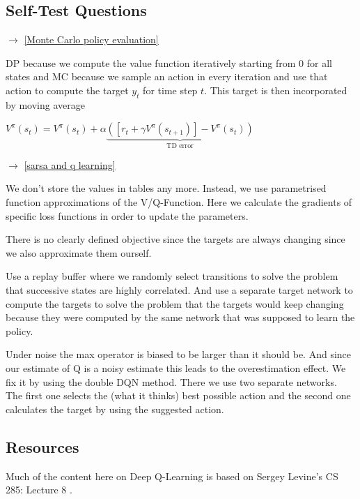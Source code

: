 \subsection{Self-Test Questions}
 \begin{enumerate}
     
 $\rightarrow$ \ref{Monte Carlo policy evaluation}

\newline DP because we compute the value function iteratively starting 
from 0 for all states and MC because we sample an action in every iteration and use 
that action to compute the target $y_t$ for time step $t$. This target is then 
incorporated by moving average 

$V^{\pi}(s_t)= V^{\pi}(s_t) + \alpha 
\underbrace{([r_t+ \gamma V^{\pi}(s_{t+1})]- V^{\pi}(s_t))}_{\text{TD error}}$

 $\rightarrow$ \ref{sarsa and q learning}

\newline We don't store the values in tables 
any more. Instead, we use parametrised function approximations of the V/Q-Function. 
Here we calculate the gradients of specific loss functions in order to update the parameters. 

 \newline There is no clearly defined 
objective since the targets are always changing since we also approximate them ourself.

\newline
Use a replay buffer where we randomly select transitions to solve the problem that 
successive states are highly correlated. And use a separate target network to 
compute the targets to solve the problem that the targets would keep changing 
because they were computed by the same network that was supposed to learn the policy.

\newline
Under noise the max operator is biased to be larger than it should be. And since our 
estimate of Q is a noisy estimate this leads to the overestimation effect. We fix it by 
using the double DQN method. There we use two separate networks. The first one selects the 
(what it thinks) best possible action and the second one calculates the target by using the 
suggested action.

\end{enumerate}

\subsection{Resources}
Much of the content here on Deep Q-Learning is based on Sergey Levine’s CS 285: Lecture 8 \cite{CS285,CS285LevineYoutube}.